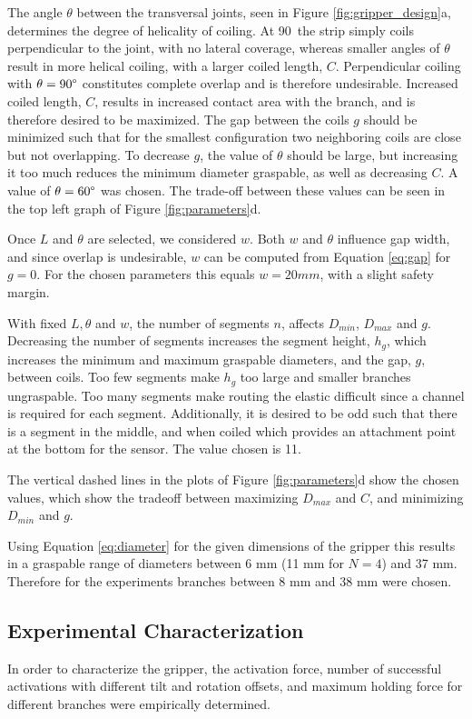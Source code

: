 The angle $\theta$ between the transversal joints, seen in Figure \ref{fig:gripper_design}a, determines the degree of helicality of coiling. At 90\degree\ the strip simply coils perpendicular to the joint, with no lateral coverage, whereas smaller angles of $\theta$ result in more helical coiling, with a larger coiled length, $C$. Perpendicular coiling with $\theta=90\degree$ constitutes complete overlap and is therefore undesirable. 
Increased  coiled length, $C$, results in increased contact area with the branch, and is therefore desired to be maximized. The gap between the coils $g$ should be minimized such that for the smallest configuration two neighboring coils are close but not overlapping. To decrease $g$, the value of $\theta$ should be large, but increasing it too much reduces the minimum diameter graspable, as well as decreasing $C$. A value of $\theta=60\degree$ was chosen. The trade-off between these values can be seen in the top left graph of Figure \ref{fig:parameters}d.

Once $L$ and $\theta$ are selected, we considered $w$. Both $w$ and $\theta$ influence gap width, and since overlap is undesirable, $w$ can be computed from Equation \ref{eq:gap} for $g=0$. For the chosen parameters this equals $w=20 mm$, with a slight safety margin.

With fixed $L, \theta$ and $w$, the number of segments $n$, affects $D_{min}$, $D_{max}$ and $g$. Decreasing the number of segments increases the segment height, $h_g$,  which increases the minimum and maximum graspable diameters, and the gap, $g$, between coils. Too few segments make $h_g$ too large and smaller branches ungraspable. Too many segments make routing the elastic difficult since a channel is required for each segment. Additionally, it is desired to be odd such that there is a segment in the middle, and when coiled which provides an attachment point at the bottom for the sensor. The value chosen is 11. 

The vertical dashed lines in the plots of Figure \ref{fig:parameters}d show the chosen values, which show the tradeoff between maximizing $D_{max}$ and $C$, and minimizing $D_{min}$ and $g$.

Using Equation \ref{eq:diameter} for the given dimensions of the gripper this results in a graspable range of diameters between 6 mm (11 mm for $N=4$) and 37 mm. Therefore for the experiments branches between 8 mm and 38 mm were chosen.


\subsection{Experimental Characterization} %
\label{sec:characterization}
In order to characterize the gripper, the activation force, number of successful activations with different tilt and rotation offsets, and maximum holding force for different branches were empirically determined. 

